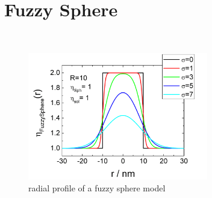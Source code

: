 
\clearpage
\section{Fuzzy Sphere}
\label{sect:FuzzySphere} ~\\

\begin{figure}[htb]
\begin{center}
\includegraphics[width=0.7\textwidth,height=0.5\textwidth]{../images/form_factor/FuzzySphere/FuzzySphereProfile.png}
\end{center}
\caption{radial profile of a fuzzy sphere model}
\label{profile:fuzzysphere}
\end{figure}

